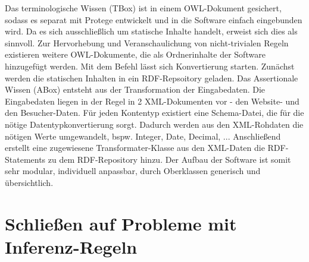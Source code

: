 \documentclass[runningheads,a4paper]{llncs}
\begin{document}
Das terminologische Wissen (TBox) ist in einem OWL-Dokument gesichert, sodass es separat mit Protege entwickelt und in die Software einfach eingebunden wird. 
Da es sich ausschließlich um statische Inhalte handelt, erweist sich dies als sinnvoll. 
Zur Hervorhebung und Veranschaulichung von nicht-trivialen Regeln existieren weitere OWL-Dokumente, die als Ordnerinhalte der Software hinzugefügt werden. 
Mit dem Befehl \cite{ruby-rdf} lässt sich Konvertierung starten. 
Zunächst werden die statischen Inhalten in ein RDF-Repsoitory geladen. 
Das Assertionale Wissen (ABox) entsteht aus der Transformation der Eingabedaten. 
Die Eingabedaten liegen in der Regel in 2 XML-Dokumenten vor - den Website- und den Besucher-Daten.
Für jeden Kontentyp existiert eine Schema-Datei, die für die nötige Datentypkonvertierung sorgt. 
Dadurch werden aus den XML-Rohdaten die nötigen Werte umgewandelt, bspw. Integer, Date, Decimal, ...
Anschließend erstellt eine zugewiesene Transformater-Klasse aus den XML-Daten die RDF-Statements zu dem RDF-Repository hinzu. 
Der Aufbau der Software ist somit sehr modular, individuell anpassbar, durch Oberklassen generisch und übersichtlich.

\newpage

\section{Schließen auf Probleme mit Inferenz-Regeln}
\label{sec:reasoning}
\end{document}
